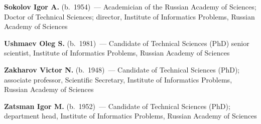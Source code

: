 \begin{multicols}{2}
\vspace*{6pt}

\noindent
\textbf{Sokolov Igor A.} (b.\ 1954)~--- Academician of the Russian Academy of Sciences;
Doctor of Technical Sciences; director,
Institute of Informatics Problems,  Russian Academy of Sciences

\vspace*{6pt}

\noindent
\textbf{Ushmaev Oleg S.} (b.\ 1981)~--- Candidate of Technical Sciences (PhD) senior scientist,
Institute of Informatics Problems,  Russian Academy of Sciences

\vspace*{6pt}


\noindent
\textbf{Zakharov Victor N.} (b.\ 1948)~--- Candidate of Technical Sciences (PhD); 
associate professor, Scientific Secretary, 
Institute of Informatics Problems,  Russian Academy of Sciences

\vspace*{6pt}


\noindent
\textbf{Zatsman Igor M.} (b.\ 1952)~--- Candidate of Technical Sciences
(PhD); department head, Institute
of Informatics Problems, Russian Academy of Sciences

\end{multicols}